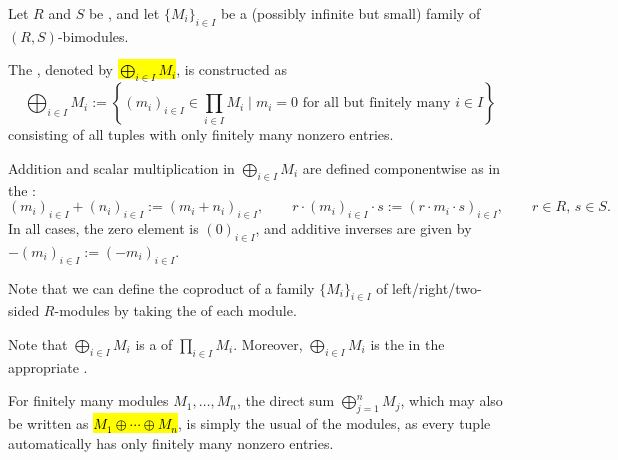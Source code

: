 \begin{definition} \label{definition:coproduct_of_modules_of_rings}
    Let $R$ and $S$ be , and let $\{ M_i \}_{i \in I}$ be a (possibly infinite but small) family of $(R,S)$-bimodules.

    The , denoted by \hl{$\bigoplus_{i \in I} M_i$}, is constructed as
    $$ \bigoplus_{i \in I} M_i := \left\{ (m_i)_{i \in I} \in \prod_{i \in I} M_i \mid m_i = 0 \text{ for all but finitely many } i \in I \right\} $$
    consisting of all tuples with only finitely many nonzero entries.

    Addition and scalar multiplication in $\bigoplus_{i \in I} M_i$ are defined componentwise as in the :
    $$ (m_i)_{i \in I} + (n_i)_{i \in I} := (m_i + n_i)_{i \in I}, \qquad r \cdot (m_i)_{i \in I} \cdot s := (r \cdot m_i \cdot s)_{i \in I}, \qquad r \in R,\, s \in S.  $$
    In all cases, the zero element is $(0)_{i \in I}$, and additive inverses are given by $-(m_i)_{i \in I} := (-m_i)_{i \in I}$. 

    Note that we can define the coproduct of a family $\{M_i\}_{i \in I}$ of left/right/two-sided $R$-modules by taking the  of each module.
    
    Note that $\bigoplus_{i \in I} M_i$ is a  of $\prod_{i \in I} M_i$. Moreover, $\bigoplus_{i \in I} M_i$ is the  in the appropriate .

    For finitely many modules $M_1,\ldots,M_n$, the direct sum $\bigoplus_{j=1}^{n} M_j$, which may also be written as \hl{$M_1 \oplus \cdots \oplus M_n$}, is simply the usual  of the modules, as every tuple automatically has only finitely many nonzero entries.
\end{definition}